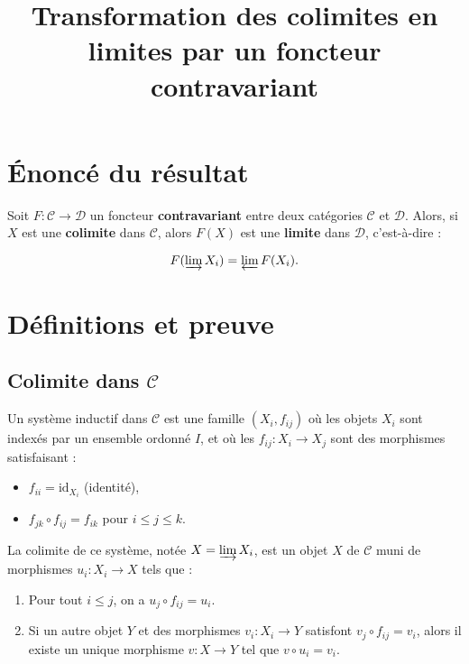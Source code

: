 \documentclass{article}
\begin{document}
	
	\title{Transformation des colimites en limites par un foncteur contravariant}
	\author{}
	\date{}
	\maketitle
	
	\section{\'Enonc\'e du r\'esultat}
	Soit \( F: \mathcal{C} \to \mathcal{D} \) un foncteur \textbf{contravariant} entre deux cat\'egories \( \mathcal{C} \) et \( \mathcal{D} \). Alors, si \( X \) est une \textbf{colimite} dans \( \mathcal{C} \), alors \( F(X) \) est une \textbf{limite} dans \( \mathcal{D} \), c'est-\`a-dire :
	
	\[
	F(\varinjlim X_i) = \varprojlim F(X_i).
	\]
	
	\section{D\'efinitions et preuve}
	
	\subsection{Colimite dans \( \mathcal{C} \)}
	Un syst\`eme inductif dans \( \mathcal{C} \) est une famille \( (X_i, f_{ij}) \) o\`u les objets \( X_i \) sont index\'es par un ensemble ordonn\'e \( I \), et o\`u les \( f_{ij}: X_i \to X_j \) sont des morphismes satisfaisant :
	\begin{itemize}
		\item \( f_{ii} = \text{id}_{X_i} \) (identit\'e),
		\item \( f_{jk} \circ f_{ij} = f_{ik} \) pour \( i \leq j \leq k \).
	\end{itemize}
	
	La colimite de ce syst\`eme, not\'ee \( X = \varinjlim X_i \), est un objet $X$ de  \( \mathcal{C} \) muni de morphismes \( u_i: X_i \to X \) tels que :
	\begin{enumerate}
		\item Pour tout \( i \leq j \), on a \( u_j \circ f_{ij} = u_i \).
		\item Si un autre objet \( Y \) et des morphismes \( v_i: X_i \to Y \) satisfont \( v_j \circ f_{ij} = v_i \), alors il existe un unique morphisme \( v: X \to Y \) tel que \( v \circ u_i = v_i \).
	\end{enumerate}
	
\end{document}

